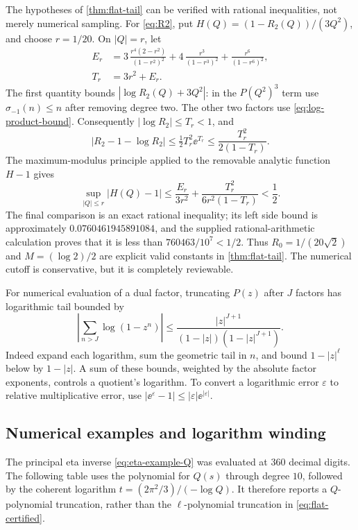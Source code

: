 The hypotheses of \cref{thm:flat-tail} can be verified with
rational inequalities, not merely numerical sampling.
For \cref{eq:R2}, put
\(H(Q)=(1-R_2(Q))/(3Q^2)\), and choose \(r=1/20\).
On \(|Q|=r\), let
\begin{align*}
 E_r&=
 3\,\frac{r^4(2-r^2)}{(1-r^2)^2}
 +4\,\frac{r^3}{(1-r^3)^2}
 +\frac{r^6}{(1-r^6)^2},\\
 T_r&=3r^2+E_r .
\end{align*}
The first quantity bounds
\(|\log R_2(Q)+3Q^2|\): in the \(P(Q^2)^3\)
term use \(\sigma_{-1}(n)\le n\) after removing degree two.
The other two factors use \cref{eq:log-product-bound}.
Consequently \(|\log R_2|\le T_r<1\), and
\[
 |R_2-1-\log R_2|
 \le \tfrac12 T_r^2\ee^{T_r}
 \le \frac{T_r^2}{2(1-T_r)}.
\]
The maximum-modulus principle applied to the removable analytic
function \(H-1\) gives
\begin{equation}\label{eq:explicit-H-bound}
 \sup_{|Q|\le r}|H(Q)-1|
 \le \frac{E_r}{3r^2}
      +\frac{T_r^2}{6r^2(1-T_r)}
 <\frac12.
\end{equation}
The final comparison is an exact rational inequality; its
left side bound is approximately \(0.0760461945891084\), and the
supplied rational-arithmetic calculation proves that it is less than
\(760463/10^7<1/2\).
Thus \(R_0=1/(20\sqrt2)\) and \(M=(\log2)/2\)
are explicit valid constants in \cref{thm:flat-tail}.
The numerical cutoff is conservative, but it is completely
reviewable.

For numerical evaluation of a dual factor, truncating
\(P(z)\) after \(J\) factors has logarithmic tail bounded by
\begin{equation}\label{eq:product-tail}
 \left|\sum_{n>J}\log(1-z^n)\right|
 \le
 \frac{|z|^{J+1}}
 {(1-|z|)(1-|z|^{J+1})}.
\end{equation}
Indeed expand each logarithm, sum the geometric tail in \(n\),
and bound \(1-|z|^\ell\) below by \(1-|z|\).
A sum of these bounds, weighted by the absolute factor exponents,
controls a quotient's logarithm.
To convert a logarithmic error \(\varepsilon\) to relative
multiplicative error, use
\(|\ee^\varepsilon-1|\le|\varepsilon|\ee^{|\varepsilon|}\).

\subsection{Numerical examples and logarithm winding}

The principal eta inverse \cref{eq:eta-example-Q}
was evaluated at 360 decimal digits.
The following table uses the polynomial for \(Q(s)\) through
degree \(10\), followed by the coherent logarithm
\(t=(2\pi^2/3)/(-\log Q)\).
It therefore reports a \(Q\)-polynomial truncation, rather than
the \(\ell\)-polynomial truncation in \cref{eq:flat-certified}.

